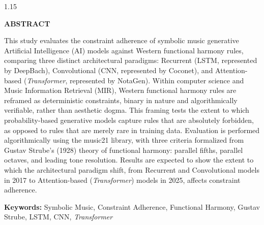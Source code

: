 \newpage
\begin{spacing}{1.15}
\begin{center}
    \textbf{ABSTRACT}
\end{center}

This study evaluates the constraint adherence of symbolic music generative Artificial Intelligence (AI) models against Western functional harmony rules, comparing three distinct architectural paradigms: Recurrent (LSTM, represented by DeepBach), Convolutional (CNN, represented by Coconet), and Attention-based (\textit{Transformer}, represented by NotaGen). Within computer science and Music Information Retrieval (MIR), Western functional harmony rules are reframed as deterministic constraints, binary in nature and algorithmically verifiable, rather than aesthetic dogma. This framing tests the extent to which probability-based generative models capture rules that are absolutely forbidden, as opposed to rules that are merely rare in training data. Evaluation is performed algorithmically using the music21 library, with three criteria formalized from Gustav Strube's (1928) theory of functional harmony: parallel fifths, parallel octaves, and leading tone resolution. Results are expected to show the extent to which the architectural paradigm shift, from Recurrent and Convolutional models in 2017 to Attention-based (\textit{Transformer}) models in 2025, affects constraint adherence.\par

\textbf{Keywords:} Symbolic Music, Constraint Adherence, Functional Harmony, Gustav Strube, LSTM, CNN, \textit{Transformer}
\end{spacing}
\newpage
